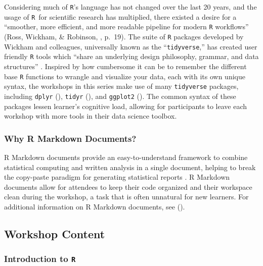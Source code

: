 \documentclass[12pt]{article}
\newcommand{\R}{\texttt{R}}
\begin{document}
\noindent Considering much of \texttt{R}'s language has not changed over the 
last 20 years, and the usage of \R~for scientific research has multiplied, there
existed a desire for a ``smoother, more efficient, and more readable pipeline
for modern \texttt{R} workflows'' (Ross, Wickham, \& Robinson, 
\citeyear{tidytools}, p.\ 19). The suite of \texttt{R} packages developed by 
Wickham and colleagues, universally known as the ``\texttt{tidyverse},'' has 
created user friendly \texttt{R} tools which ``share an underlying design
philosophy, grammar, and data structures'' \citep{tidyverse}. Inspired by how
cumbersome it can be to remember the different base \texttt{R} functions to
wrangle and visualize your data, each with its own unique syntax, the workshops
in this series make use of many \texttt{tidyverse} packages, including 
\texttt{dplyr} (\citeyear{dplyr}), \texttt{tidyr} (\citeyear{tidyr}), and 
\texttt{ggplot2} (\citeyear{ggplot}). The common syntax of these packages lessen
learner's cognitive load, allowing for participants to leave each workshop with
more tools in their data science toolbox. 


\subsubsection{Why R Markdown Documents?}

\noindent  R Markdown documents provide an easy-to-understand framework to combine
statistical computing and written analysis in a single document, helping to
break the copy-paste paradigm for generating statistical reports
\citep{mine-rmarkdown}. R Markdown documents allow for attendees to keep their
code organized and their workspace clean during the workshop, a task that is 
often unnatural for new learners. For additional
information on R Markdown documents, see \citeauthor{mine-rmarkdown} 
(\citeyear{mine-rmarkdown}). 




\subsection{Workshop Content}

\subsubsection{Introduction to \texttt{R}}
\label{sec:introR}
\end{document}
